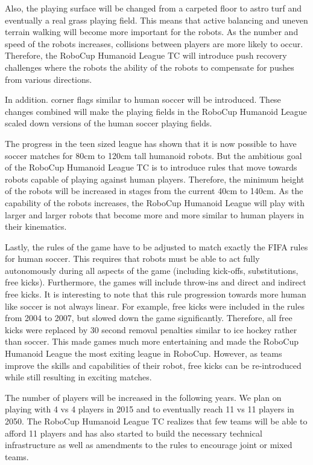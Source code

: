\documentclass{llncs}
\begin{document}
Also, the playing surface will be changed from a carpeted floor to
astro turf and eventually a real grass playing field. This means that
active balancing and uneven terrain walking will become more important
for the robots. As the number and speed of the robots increases,
collisions between players are more likely to occur. Therefore, the
RoboCup Humanoid League TC will introduce push recovery challenges
where the robots the ability of the robots to compensate for pushes
from various directions.

In addition. corner flags similar to human soccer will be
introduced. These changes combined will make the playing fields in the
RoboCup Humanoid League scaled down versions of the human soccer
playing fields.

The progress in the teen sized league has shown that it is now
possible to have soccer matches for 80cm to 120cm tall humanoid
robots. But the ambitious goal of the RoboCup Humanoid League TC is to
introduce rules that move towards robots capable of playing against
human players. Therefore, the minimum height of the robots will be
increased in stages from the current 40cm to 140cm. As the capability
of the robots increases, the RoboCup Humanoid League will play with
larger and larger robots that become more and more similar to human
players in their kinematics.

Lastly, the rules of the game have to be adjusted to match exactly the
FIFA rules for human soccer. This requires that robots must be able to
act fully autonomously during all aspects of the game (including
kick-offs, substitutions, free kicks). Furthermore, the games will
include throw-ins and direct and indirect free kicks. It is
interesting to note that this rule progression towards more human like
soccer is not always linear. For example, free kicks were included in
the rules from 2004 to 2007, but slowed down the game
significantly. Therefore, all free kicks were replaced by 30 second
removal penalties similar to ice hockey rather than soccer. This made
games much more entertaining and made the RoboCup Humanoid League the
most exiting league in RoboCup. However, as teams improve the skills
and capabilities of their robot, free kicks can be re-introduced while
still resulting in exciting matches.

The number of players will be increased in the following years. We
plan on playing with 4 vs 4 players in 2015 and to eventually reach 11
vs 11 players in 2050. The RoboCup Humanoid League TC realizes that
few teams will be able to afford 11 players and has also started to
build the necessary technical infrastructure as well as amendments to
the rules to encourage joint or mixed teams.
\end{document}
